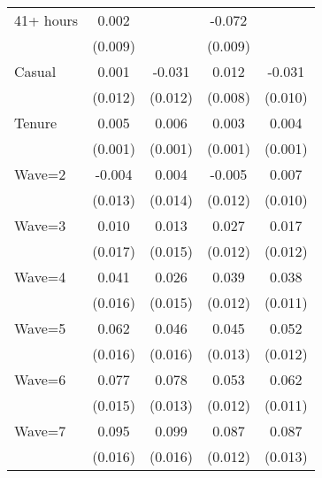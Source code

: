 {\begin{tabular}{l*{4}{c}}
41+ hours           &       0.002         &                     &      -0.072\sym{***}&                     \\
                    &     (0.009)         &                     &     (0.009)         &                     \\
Casual              &       0.001         &      -0.031\sym{**} &       0.012         &      -0.031\sym{***}\\
                    &     (0.012)         &     (0.012)         &     (0.008)         &     (0.010)         \\
Tenure              &       0.005\sym{***}&       0.006\sym{***}&       0.003\sym{***}&       0.004\sym{***}\\
                    &     (0.001)         &     (0.001)         &     (0.001)         &     (0.001)         \\
Wave=2              &      -0.004         &       0.004         &      -0.005         &       0.007         \\
                    &     (0.013)         &     (0.014)         &     (0.012)         &     (0.010)         \\
Wave=3              &       0.010         &       0.013         &       0.027\sym{**} &       0.017         \\
                    &     (0.017)         &     (0.015)         &     (0.012)         &     (0.012)         \\
Wave=4              &       0.041\sym{***}&       0.026\sym{*}  &       0.039\sym{***}&       0.038\sym{***}\\
                    &     (0.016)         &     (0.015)         &     (0.012)         &     (0.011)         \\
Wave=5              &       0.062\sym{***}&       0.046\sym{***}&       0.045\sym{***}&       0.052\sym{***}\\
                    &     (0.016)         &     (0.016)         &     (0.013)         &     (0.012)         \\
Wave=6              &       0.077\sym{***}&       0.078\sym{***}&       0.053\sym{***}&       0.062\sym{***}\\
                    &     (0.015)         &     (0.013)         &     (0.012)         &     (0.011)         \\
Wave=7              &       0.095\sym{***}&       0.099\sym{***}&       0.087\sym{***}&       0.087\sym{***}\\
                    &     (0.016)         &     (0.016)         &     (0.012)         &     (0.013)         \\

\end{tabular}}
